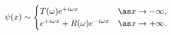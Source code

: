 \begin{equation}
\psi(x) \sim
\begin{cases}
T(\omega) e^{+i \omega x}  \label{transmission-boundary} & \as x \to -\infty, \\
e^{+i \omega x} + R(\omega) e^{-i \omega x} & \as x \to +\infty. 
\end{cases}
\end{equation}

